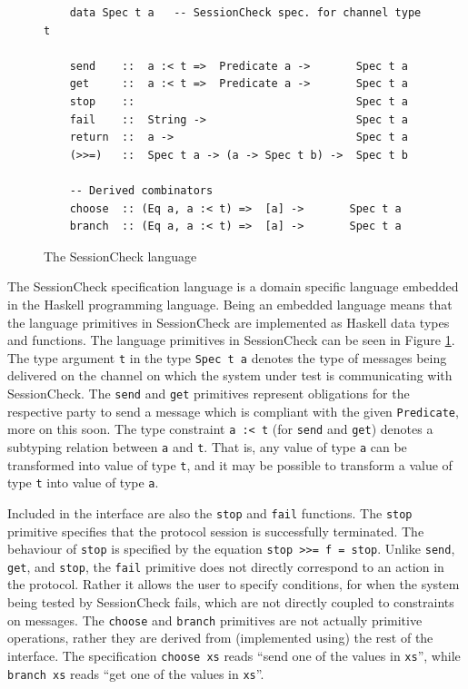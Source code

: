 \documentclass{article}
\begin{document}
\begin{figure}[tbp]
  \begin{verbatim}
    data Spec t a   -- SessionCheck spec. for channel type t

    send    ::  a :< t =>  Predicate a ->       Spec t a
    get     ::  a :< t =>  Predicate a ->       Spec t a
    stop    ::                                  Spec t a
    fail    ::  String ->                       Spec t a
    return  ::  a ->                            Spec t a
    (>>=)   ::  Spec t a -> (a -> Spec t b) ->  Spec t b

    -- Derived combinators
    choose  :: (Eq a, a :< t) =>  [a] ->       Spec t a
    branch  :: (Eq a, a :< t) =>  [a] ->       Spec t a
  \end{verbatim}
  \caption{\label{fig:SessionCheck:language} The SessionCheck language}
\end{figure}
%
The SessionCheck specification language is a domain specific language embedded in the Haskell \cite{Haskell}
programming language.
%
Being an embedded language means that the language primitives in SessionCheck are
implemented as Haskell data types and functions.
%
The language primitives in SessionCheck can be seen in Figure \ref{fig:SessionCheck:language}.
%
The type argument \texttt{t} in the type \texttt{Spec t a} denotes the type of messages
being delivered on the channel on which the system under test is communicating
with SessionCheck.
%
The \texttt{send} and \texttt{get} primitives represent obligations for the respective party to send a message
which is compliant with the given \texttt{Predicate}, more on this soon.
%
The type constraint \texttt{a :< t} (for \texttt{send} and
\texttt{get}) denotes a subtyping relation between \texttt{a} and
\texttt{t}.
%
That is, any value of type \texttt{a} can be transformed into value of type \texttt{t}, and it may be
possible to transform a value of type \texttt{t} into value of type \texttt{a}.
%

Included in the interface are also the \texttt{stop} and \texttt{fail} functions.
%
The \texttt{stop} primitive specifies that the protocol session is successfully terminated.
%
The behaviour of \texttt{stop} is specified by the equation \texttt{stop >>= f = stop}.
%
Unlike \texttt{send}, \texttt{get}, and \texttt{stop},
the \texttt{fail} primitive does not directly correspond to an action in the protocol.
%
Rather it allows the user to specify conditions, for when the system being tested by SessionCheck fails,
which are not directly coupled to constraints on messages.
%
The \texttt{choose} and \texttt{branch} primitives are not actually
primitive operations, rather they are derived from (implemented using)
the rest of the interface.
%
The specification \texttt{choose xs} reads ``send one of the values in \texttt{xs}'',
while \texttt{branch xs} reads ``get one
of the values in \texttt{xs}''.
\end{document}
